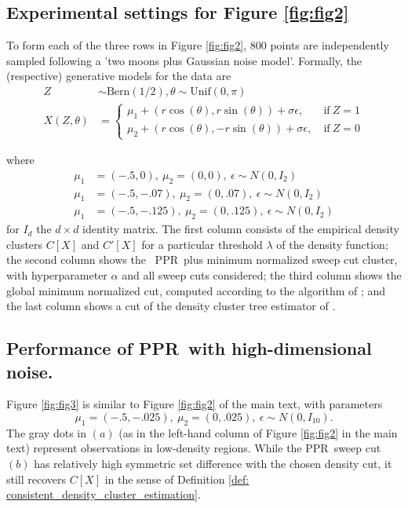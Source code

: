 \documentclass[11pt,twoside]{article}
\newcommand{\1}{\mathbf{1}}
\newcommand{\Xbf}{X}             %
\newcommand{\pprspace}{{\sc PPR~}}
\begin{document}
\subsection{Experimental settings for Figure \ref{fig:fig2}}

To form each of the three rows in Figure \ref{fig:fig2}, 800 points are independently sampled following a 'two moons plus Gaussian noise model'. Formally, the (respective) generative models for the data are
\begin{align}
Z & \sim \textrm{Bern}(1/2), \theta \sim \textrm{Unif}(0, \pi) \\
X(Z,\theta) & = 
\begin{cases}
\mu_1 + (r \cos(\theta), r \sin(\theta)) + \sigma \epsilon,~ & \text{if}~ Z = 1 \\
\mu_2 + (r \cos(\theta), - r \sin(\theta)) + \sigma \epsilon,~ & \text{if}~ Z = 0
\end{cases}
\end{align}

where 
\begin{align*}
\mu_1 & = (-.5, 0),~ \mu_2 = (0,0),~ \epsilon \sim N(0, I_2) \tag{row 1} \\
\mu_1 & = (-.5, -.07),~ \mu_2 = (0,.07),~ \epsilon \sim N(0, I_2) \tag{row 2} \\
\mu_1 & = (-.5, -.125),~ \mu_2 = (0,.125),~ \epsilon \sim N(0, I_2) \tag{row 3} 
\end{align*}
for $I_d$ the $d \times d$ identity matrix. The first column consists of the empirical density clusters $C[\Xbf]$ and $C'[\Xbf]$ for a particular threshold $\lambda$ of the density function; the second column shows the ~\pprspace plus minimum normalized sweep cut cluster, with hyperparameter $\alpha$ and all sweep cuts considered; the third column shows the global minimum normalized cut, computed according to the algorithm of \cite{szlam2010}; and the last column shows a cut of the density cluster tree estimator of \cite{chaudhuri2010}.

\subsection{Performance of \pprspace with high-dimensional noise.}

Figure \ref{fig:fig3} is similar to Figure \ref{fig:fig2} of the main text, with parameters
\begin{equation*}
\mu_1 = (-.5, -.025),~ \mu_2 = (0,.025),~ \epsilon \sim N(0, I_{10}).
\end{equation*}
The gray dots in $(a)$ (as in the left-hand column of Figure \ref{fig:fig2} in the main text) represent observations in low-density regions. While the \pprspace sweep cut $(b)$ has relatively high symmetric set difference with the chosen density cut, it still recovers $C[\Xbf]$ in the sense of Definition \ref{def: consistent_density_cluster_estimation}.
\end{document}
